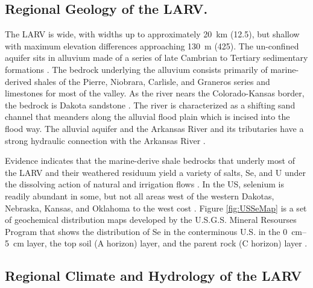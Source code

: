 \begin{linenumbers}[1]
\subsection*{Regional Geology of the LARV.}
The LARV is wide, with widths up to approximately \SI{20}{\kilo\meter} (\SI{12.5}{\mile}), but shallow with maximum elevation differences approaching \SI{130}{\meter} (\SI{425}{\foot}).  The un-confined aquifer sits in alluvium made of a series of late Cambrian to Tertiary sedimentary formations \parencite{darton1906}.  The bedrock underlying the alluvium consists primarily of marine-derived shales of the Pierre, Niobrara, Carlisle, and Graneros series and limestones for most of the valley.  As the river nears the Colorado-Kansas border, the bedrock is Dakota sandstone \parencite{moore1967} .  The river is characterized as a shifting sand channel that meanders along the alluvial flood plain which is incised into the flood way.  The alluvial aquifer and the Arkansas River and its tributaries have a strong hydraulic connection with the Arkansas River \parencite{konikow1974}.

Evidence indicates that the marine-derive shale bedrocks that underly most of the LARV and their weathered residuum yield a variety of salts, Se, and U under the dissolving action of natural and irrigation flows \parencite{zielinski1995,zielinski1997,gates2009,Bailey2012}.  In the US, selenium is readily abundant in some, but not all areas west of the western Dakotas, Nebraska, Kansas, and Oklahoma to the west cost \parencite{Painter1940}.  Figure \ref{fig:USSeMap} is a set of geochemical distribution maps developed by the U.S.G.S. Mineral Resourses Program that shows the distribution of Se in the conterminous U.S. in the \SIrange{0}{5}{\centi\meter} layer, the top soil (A horizon) layer, and the parent rock (C horizon) layer \parencite{2014Smith}.


\subsection*{Regional Climate and Hydrology of the LARV}


\end{linenumbers}
